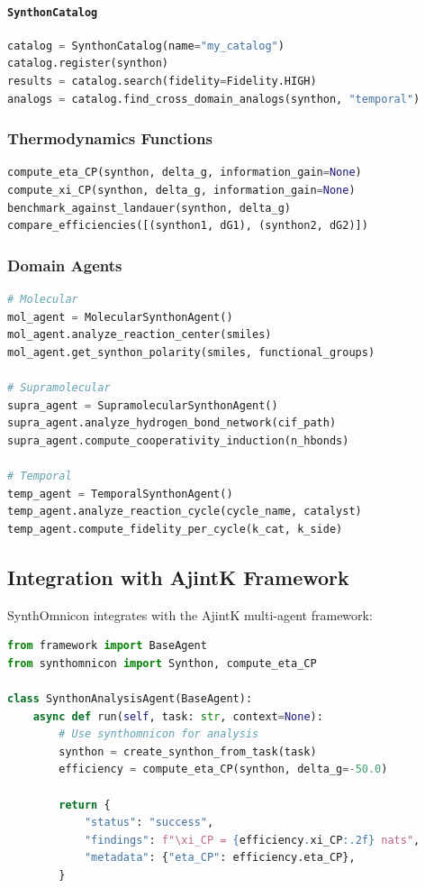\documentclass[12pt,a4paper]{article}
\begin{document}
\paragraph{\texttt{SynthonCatalog}}

\begin{lstlisting}[language=Python]
catalog = SynthonCatalog(name="my_catalog")
catalog.register(synthon)
results = catalog.search(fidelity=Fidelity.HIGH)
analogs = catalog.find_cross_domain_analogs(synthon, "temporal")
\end{lstlisting}

\subsubsection{Thermodynamics Functions}

\begin{lstlisting}[language=Python]
compute_eta_CP(synthon, delta_g, information_gain=None)
compute_xi_CP(synthon, delta_g, information_gain=None)
benchmark_against_landauer(synthon, delta_g)
compare_efficiencies([(synthon1, dG1), (synthon2, dG2)])
\end{lstlisting}

\subsubsection{Domain Agents}

\begin{lstlisting}[language=Python]
# Molecular
mol_agent = MolecularSynthonAgent()
mol_agent.analyze_reaction_center(smiles)
mol_agent.get_synthon_polarity(smiles, functional_groups)

# Supramolecular
supra_agent = SupramolecularSynthonAgent()
supra_agent.analyze_hydrogen_bond_network(cif_path)
supra_agent.compute_cooperativity_induction(n_hbonds)

# Temporal
temp_agent = TemporalSynthonAgent()
temp_agent.analyze_reaction_cycle(cycle_name, catalyst)
temp_agent.compute_fidelity_per_cycle(k_cat, k_side)
\end{lstlisting}

\subsection{Integration with AjintK Framework}

SynthOmnicon integrates with the AjintK multi-agent framework:

\begin{lstlisting}[language=Python]
from framework import BaseAgent
from synthomnicon import Synthon, compute_eta_CP

class SynthonAnalysisAgent(BaseAgent):
    async def run(self, task: str, context=None):
        # Use synthomnicon for analysis
        synthon = create_synthon_from_task(task)
        efficiency = compute_eta_CP(synthon, delta_g=-50.0)

        return {
            "status": "success",
            "findings": f"\xi_CP = {efficiency.xi_CP:.2f} nats",
            "metadata": {"eta_CP": efficiency.eta_CP},
        }
\end{lstlisting}
\end{document}
